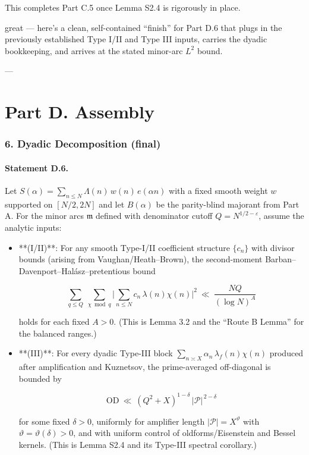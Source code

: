 \documentclass[11pt]{article}
\theoremstyle{definition}
\theoremstyle{remark}
\begin{document}
This completes Part C.5 once Lemma S2.4 is rigorously in place.

great — here’s a clean, self-contained “finish” for Part D.6 that plugs in the previously established Type I/II and Type III inputs, carries the dyadic bookkeeping, and arrives at the stated minor-arc $L^2$ bound.

---

\part*{Part D. Assembly}

\section*{6. Dyadic Decomposition (final)}

\subsection*{Statement D.6.}

Let $S(\alpha)=\sum_{n\le N}\Lambda(n)\,w(n)\,e(\alpha n)$ with a fixed smooth weight $w$ supported on $[N/2,2N]$ and let $B(\alpha)$ be the parity-blind majorant from Part A. For the minor arcs $\mathfrak m$ defined with denominator cutoff $Q=N^{1/2-\varepsilon}$, assume the analytic inputs:

\begin{itemize}
\item **(I/II)**: For any smooth Type-I/II coefficient structure $\{c_n\}$ with divisor bounds (arising from Vaughan/Heath–Brown), the second-moment Barban–Davenport–Halász–pretentious bound

\begin{equation}
\sum_{q\le Q}\ \sum_{\chi\bmod q}\Big|\sum_{n\le N} c_n\,\lambda(n)\chi(n)\Big|^2
\ \ll\ \frac{NQ}{(\log N)^A}
\tag{D.1}
\end{equation}

holds for each fixed $A>0$. (This is Lemma 3.2 and the “Route B Lemma” for the balanced ranges.)

\item **(III)**: For every dyadic Type-III block $\sum_{n\asymp X}\alpha_n\,\lambda_f(n)\chi(n)$ produced after amplification and Kuznetsov, the prime-averaged off-diagonal is bounded by

\begin{equation}
\mathrm{OD}\ \ll\ (Q^2+X)^{1-\delta}\,|\mathcal P|^{\,2-\delta}
\tag{D.2}
\end{equation}

for some fixed $\delta>0$, uniformly for amplifier length $|\mathcal P|=X^\vartheta$ with $\vartheta=\vartheta(\delta)>0$, and with uniform control of oldforms/Eisenstein and Bessel kernels. (This is Lemma S2.4 and its Type-III spectral corollary.)
\end{itemize}
\end{document}
